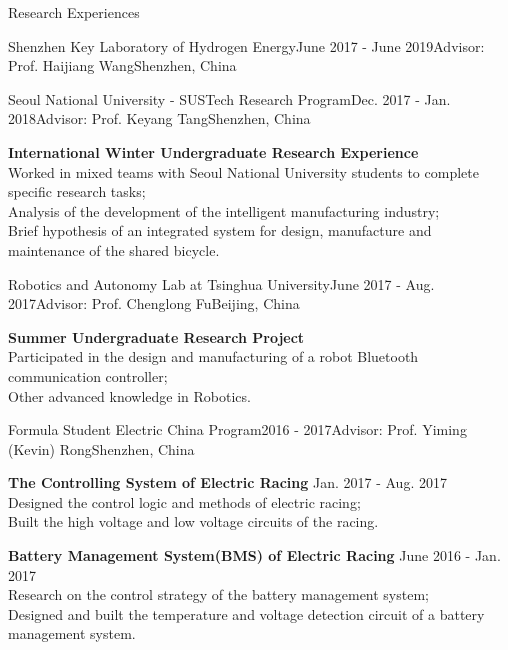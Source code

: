 \documentclass{resume} %
\begin{document}
\begin{rSection}{Research Experiences}
\begin{rSubsection}{Shenzhen Key Laboratory of Hydrogen Energy}{June 2017 - June 2019}{Advisor: Prof. Haijiang Wang}{Shenzhen, China}
    \end{rSubsection}

    \begin{rSubsection}{Seoul National University - SUSTech Research Program}{Dec. 2017 - Jan. 2018}{Advisor: Prof. Keyang Tang}{Shenzhen, China}
        \vspace{-4pt}
        \item \textbf{International Winter Undergraduate Research Experience} \\
        Worked in mixed teams with Seoul National University students to complete specific research tasks;\\ 
        Analysis of the development of the intelligent manufacturing industry; \\
        Brief hypothesis of an integrated system for design, manufacture and maintenance of the shared bicycle.
    \end{rSubsection}

    \begin{rSubsection}{Robotics and Autonomy Lab at Tsinghua University}{June 2017 - Aug. 2017}{Advisor: Prof. Chenglong Fu}{Beijing, China}
        \vspace{-4pt}
        \item \textbf{Summer Undergraduate Research Project} \\
        Participated in the design and manufacturing of a robot Bluetooth communication controller; \\
        Other advanced knowledge in Robotics.
    \end{rSubsection}

    \begin{rSubsection}{Formula Student Electric China Program}{2016 - 2017}{Advisor: Prof. Yiming (Kevin) Rong}{Shenzhen, China}
        \vspace{-4pt}
        \item \textbf{The Controlling System of Electric Racing}  \hfill { Jan. 2017 - Aug. 2017}\\
        Designed the control logic and methods of electric racing;\\
        Built the high voltage and low voltage circuits of the racing.
        \item \textbf{Battery Management System(BMS) of Electric Racing}  \hfill { June 2016 - Jan. 2017}\\
        Research on the control strategy of the battery management system; \\
        Designed and built the temperature and voltage detection circuit of a battery management system.

    \end{rSubsection}
 
\end{rSection}
\end{document}
